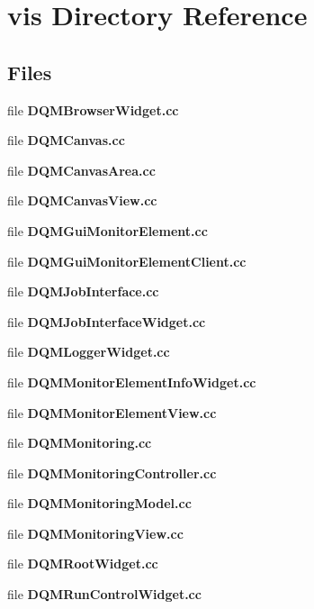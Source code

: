 \section{vis Directory Reference}
\label{dir_43e9b1f492f260ea2202d260f8908e51}
\subsection*{Files}
\begin{DoxyCompactItemize}
\item 
file {\bf D\+Q\+M\+Browser\+Widget.\+cc}
\item 
file {\bf D\+Q\+M\+Canvas.\+cc}
\item 
file {\bf D\+Q\+M\+Canvas\+Area.\+cc}
\item 
file {\bf D\+Q\+M\+Canvas\+View.\+cc}
\item 
file {\bf D\+Q\+M\+Gui\+Monitor\+Element.\+cc}
\item 
file {\bf D\+Q\+M\+Gui\+Monitor\+Element\+Client.\+cc}
\item 
file {\bf D\+Q\+M\+Job\+Interface.\+cc}
\item 
file {\bf D\+Q\+M\+Job\+Interface\+Widget.\+cc}
\item 
file {\bf D\+Q\+M\+Logger\+Widget.\+cc}
\item 
file {\bf D\+Q\+M\+Monitor\+Element\+Info\+Widget.\+cc}
\item 
file {\bf D\+Q\+M\+Monitor\+Element\+View.\+cc}
\item 
file {\bf D\+Q\+M\+Monitoring.\+cc}
\item 
file {\bf D\+Q\+M\+Monitoring\+Controller.\+cc}
\item 
file {\bf D\+Q\+M\+Monitoring\+Model.\+cc}
\item 
file {\bf D\+Q\+M\+Monitoring\+View.\+cc}
\item 
file {\bf D\+Q\+M\+Root\+Widget.\+cc}
\item 
file {\bf D\+Q\+M\+Run\+Control\+Widget.\+cc}
\end{DoxyCompactItemize}
